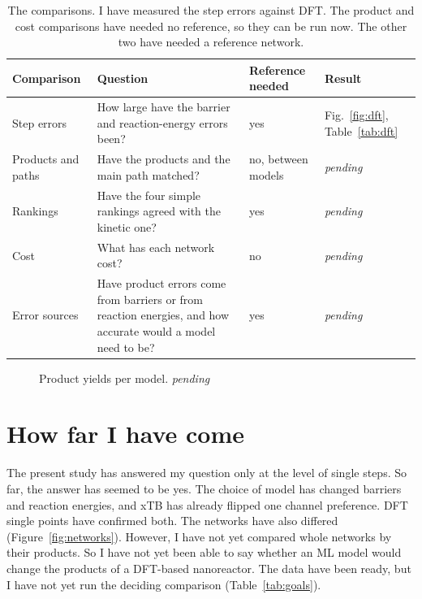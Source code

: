 \documentclass[11pt]{article}
\newcommand{\tba}[1][pending]{\textcolor{muted}{\emph{#1}}}
\begin{document}
\begin{table}[htbp]
\centering
\caption{The comparisons. I have measured the step errors against DFT.
The product and cost comparisons have needed no reference, so they can be
run now. The other two have needed a reference network.}
\label{tab:eval}
\small
\begin{tabularx}{\linewidth}{@{}l>{\raggedright\arraybackslash}Xll@{}}
\toprule
Comparison & Question & Reference needed & Result \\
\midrule
Step errors & How large have the barrier and reaction-energy errors been?
& yes & Fig.~\ref{fig:dft}, Table~\ref{tab:dft} \\
Products and paths & Have the products and the main path matched? & no,
between models & \tba \\
Rankings & Have the four simple rankings agreed with the kinetic one? &
yes & \tba \\
Cost & What has each network cost? & no & \tba \\
Error sources & Have product errors come from barriers or from reaction
energies, and how accurate would a model need to be? & yes & \tba \\
\bottomrule
\end{tabularx}
\end{table}

\begin{figure}[htbp]
\centering
\caption{Product yields per model. \tba}
\label{fig:yields}
\end{figure}

\section{How far I have come}
\label{sec:close}

The present study has answered my question only at the level of single
steps. So far, the answer has seemed to be yes. The choice of model has
changed barriers and reaction energies, and xTB has already flipped one
channel preference. DFT single points have confirmed both. The networks
have also differed (Figure~\ref{fig:networks}). However, I have not yet
compared whole networks by their products. So I have not yet been able to
say whether an ML model would change the products of a DFT-based
nanoreactor. The data have been ready, but I
have not yet run the deciding comparison (Table~\ref{tab:goals}).
\end{document}
